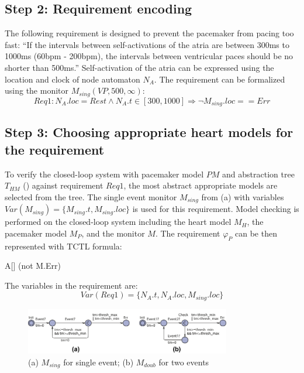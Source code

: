 \subsection*{Step 2: Requirement encoding}
The following requirement is designed to prevent the pacemaker from pacing too fast: 
``If the intervals between self-activations of the atria are between 300ms to 1000ms (60bpm - 200bpm), the intervals between ventricular paces should be no shorter than 500ms.''
Self-activation of the atria can be expressed using the location and clock of node automaton $N_A$.
The requirement can be formalized using the monitor  $M_{sing}(VP,500,\infty)$:
\[Req1: N_A.loc=Rest \land N_A.t\in [300,1000] \Rightarrow \neg M_{sing}.loc==Err\]
%
 \subsection*{Step 3: Choosing appropriate heart models for the requirement}
To verify the closed-loop system with pacemaker model $PM$ and abstraction tree $T_{HM}$ () against requirement $Req1$, the most abstract appropriate models are selected from the tree. 
The single event monitor $M_{sing}$ from (a) with variables $Var(M_{sing})=\{M_{sing}.t,M_{sing}.loc\}$ is used for this requirement. Model checking is performed on the closed-loop system including the heart model $M_H$, the pacemaker model $M_P$, and the monitor $M$. The requirement $\varphi_P$ can be then represented with TCTL formula:
\begin{center}
 \textsf{A[] (not M.Err)}
\end{center}
The variables in the requirement are:
$$Var(Req1)=\{N_A.t,N_A.loc,M_{sing}.loc\}$$
\begin{figure}[b]
		\centering
		\includegraphics[width=0.8\textwidth]{figs/monitor.pdf}
		\caption{\small (a) $M_{sing}$ for single event; (b) $M_{doub}$ for two events}
		  \vspace{-10pt}
		\label{fig:monitor}
\end{figure}

